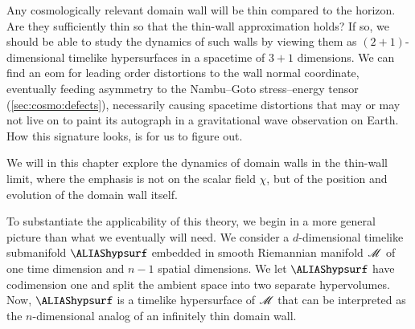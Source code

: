 



\newcommand*\hypsurf{\ALIAShypsurf}             %
\newcommand*\sppt{\ALIASsppt}                   %
\newcommand*\pert{\ALIASpert}                   %
\newcommand{\hypacc}[1]{\widehat{#1}} %








Any cosmologically relevant domain wall will be thin compared to the horizon. Are they sufficiently thin so that the thin-wall approximation holds? If so, we should be able to study the dynamics of such walls by viewing them as $(2+1)$-dimensional timelike hypersurfaces in a spacetime of $3+1$ dimensions. We can find an eom for leading order distortions to the wall normal coordinate, eventually feeding asymmetry to the Nambu--Goto stress--energy tensor (\cref{sec:cosmo:defects}), necessarily causing spacetime distortions that may or may not live on to paint its autograph in a gravitational wave observation on Earth. How this signature looks, is for us to figure out. 





We will in this chapter explore the dynamics of domain walls in the thin-wall limit, where the emphasis is not on the scalar field $\chi$, but of the position and evolution of the domain wall itself.


To substantiate the applicability of this theory, we begin in a more general picture than what we eventually will need. We consider a $d$-dimensional timelike submanifold $\hypsurf$ embedded in smooth Riemannian manifold $\mathscr{M}$ of one time dimension and $n-1$ spatial dimensions. 
We let $\hypsurf$ have codimension one and split the ambient space into two separate hypervolumes. Now, $\hypsurf$ is a timelike hypersurface of $\mathscr{M}$ that can be interpreted as the $n$-dimensional analog of an infinitely thin domain wall.%



